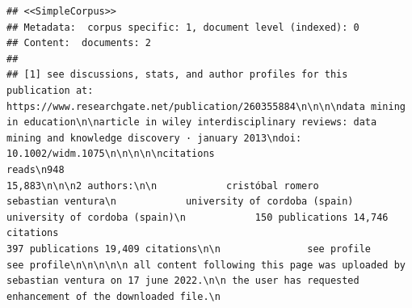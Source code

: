 \documentclass[
]{article}
\begin{document}
\begin{verbatim}
## <<SimpleCorpus>>
## Metadata:  corpus specific: 1, document level (indexed): 0
## Content:  documents: 2
## 
## [1] see discussions, stats, and author profiles for this publication at: https://www.researchgate.net/publication/260355884\n\n\n\ndata mining in education\n\narticle in wiley interdisciplinary reviews: data mining and knowledge discovery · january 2013\ndoi: 10.1002/widm.1075\n\n\n\n\ncitations                                                                                              reads\n948                                                                                                    15,883\n\n\n2 authors:\n\n            cristóbal romero                                                                                      sebastian ventura\n            university of cordoba (spain)                                                                         university of cordoba (spain)\n            150 publications 14,746 citations                                                                     397 publications 19,409 citations\n\n               see profile                                                                                           see profile\n\n\n\n\n all content following this page was uploaded by sebastian ventura on 17 june 2022.\n\n the user has requested enhancement of the downloaded file.\n                                                                                                                                                                                                                                                                                                                                                                                                                                                                                                                                                                                                                                                                                                                                                                                                                                                                                                                                                                                                                                                                                                                                                                                                                                                                                                                                                                                                                                                                                                                                                                                                                                                                                                                                                                                                                                                                                                                                                                           
\end{verbatim}
\end{document}
